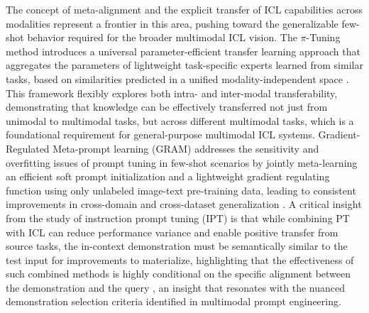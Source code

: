 \documentclass[11pt]{article}
\begin{document}
The concept of meta-alignment and the explicit transfer of ICL capabilities across modalities represent a frontier in this area, pushing toward the generalizable few-shot behavior required for the broader multimodal ICL vision. The \(\pi\)-Tuning method introduces a universal parameter-efficient transfer learning approach that aggregates the parameters of lightweight task-specific experts learned from similar tasks, based on similarities predicted in a unified modality-independent space \cite{ref250}. This framework flexibly explores both intra- and inter-modal transferability, demonstrating that knowledge can be effectively transferred not just from unimodal to multimodal tasks, but across different multimodal tasks, which is a foundational requirement for general-purpose multimodal ICL systems. Gradient-Regulated Meta-prompt learning (GRAM) addresses the sensitivity and overfitting issues of prompt tuning in few-shot scenarios by jointly meta-learning an efficient soft prompt initialization and a lightweight gradient regulating function using only unlabeled image-text pre-training data, leading to consistent improvements in cross-domain and cross-dataset generalization \cite{ref158}. A critical insight from the study of instruction prompt tuning (IPT) is that while combining PT with ICL can reduce performance variance and enable positive transfer from source tasks, the in-context demonstration must be semantically similar to the test input for improvements to materialize, highlighting that the effectiveness of such combined methods is highly conditional on the specific alignment between the demonstration and the query \cite{ref31}, an insight that resonates with the nuanced demonstration selection criteria identified in multimodal prompt engineering.
\end{document}
